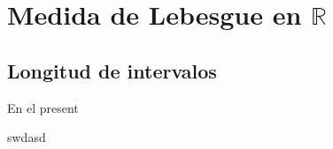 \chapter{Medida de Lebesgue en $\mathbb{R}$}

\section{Longitud de intervalos}

En el present



swdasd


